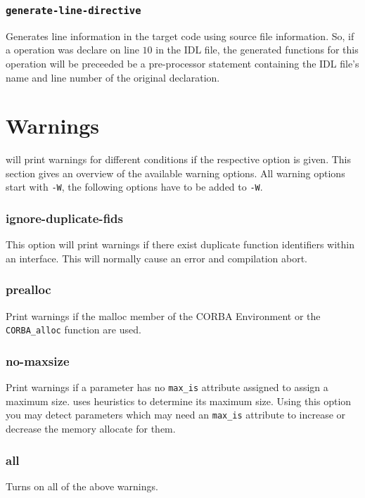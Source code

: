 \subsubsection{\tt generate-line-directive}
Generates line information in the target code using source file
information.  So, if a operation was declare on line $10$ in the
IDL file, the generated functions for this operation will be preceeded
be a pre-processor statement containing the IDL file's name and
line number of the original declaration.

\section{Warnings}
\dice{} will print warnings for different conditions if the respective
option is given. This section gives an overview of the available warning
options. All warning options start with \verb|-W|, the following options
have to be added to \verb|-W|.

\subsubsection{ignore-duplicate-fids}
This option will print warnings if there exist duplicate function identifiers
within an interface. This will normally cause an error and compilation 
abort.

\subsubsection{prealloc}
Print warnings if the malloc member of the CORBA Environment or the
\verb|CORBA_alloc| function are used.

\subsubsection{no-maxsize}
Print warnings if a parameter has no \verb|max_is| attribute assigned
to assign a maximum size. \dice{} uses heuristics to determine its
maximum size. Using this option you may detect parameters which may
need an \verb|max_is| attribute to increase or decrease the memory
allocate for them.

\subsubsection{all}
Turns on all of the above warnings.

